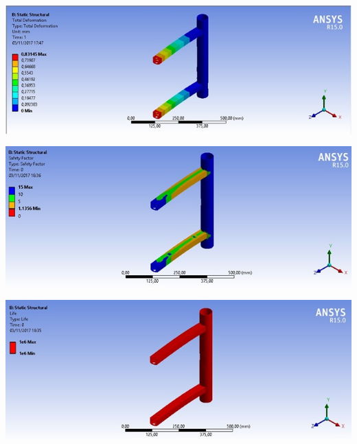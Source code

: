     \begin{center}
    	\includegraphics[scale=0.7]{figuras/deformacao_1}
        \label{deformacao_1}
    \end{center}

    \begin{center}
    	\includegraphics[scale=0.7]{figuras/fator_seguranca_3}
        \label{fator_seguranca_3}
    \end{center}
    
    \begin{center}
    	\includegraphics[scale=0.7]{figuras/vida_util_3}
        \label{vida_util_3}
    \end{center}


